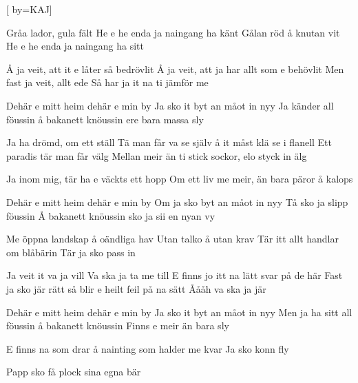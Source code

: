 

[ 		%
	by={KAJ}]						%
	

\beginverse*						%
Gråa lador, gula fält
He e he enda ja naingang ha känt
Gålan röd å knutan vit
He e he enda ja naingang ha sitt

Å ja veit, att it e låter så bedrövlit
Å ja veit, att ja har allt som e behövlit
Men fast ja veit, allt ede
Så har ja it na ti jämför me
\endverse							%

\beginchorus
Dehär e mitt heim
dehär e min by 
Ja sko it byt an måot in nyy
Ja känder all föussin
å bakanett knöussin
ere bara massa sly
\endchorus

\beginverse*						%
Ja ha drömd, om ett ställ
Tä man får va se själv å it måst klä se i flanell
Ett paradis tär man får välg
Mellan meir än ti stick sockor, elo styck in älg

Ja inom mig, tär ha e väckts ett hopp
Om ett liv me meir, än bara päror å kalops
\endverse							%

\beginchorus
Dehär e mitt heim
dehär e min by 
Om ja sko byt an måot in nyy
Tå sko ja slipp föussin
Å bakanett knöussin
sko ja sii en nyan vy
\endchorus

\beginverse*						%
Me öppna landskap å oändliga hav
Utan talko å utan krav
Tär itt allt handlar om blåbärin
Tär ja sko pass in

Ja veit it va ja vill
Va ska ja ta me till
E finns jo itt na lätt svar på de här
Fast ja sko jär rätt 
så blir e heilt feil på na sätt
Åååh va ska ja jär
\endverse							%

\beginchorus
Dehär e mitt heim
dehär e min by 
Ja sko it byt an måot in nyy
Men ja ha sitt all föussin
å bakanett knöussin
Finns e meir än bara sly
\endchorus

\beginverse*						%
E finns na som drar
å nainting som halder me kvar
Ja sko konn fly

Papp sko få plock sina egna bär
\endverse							%


\endsong							%